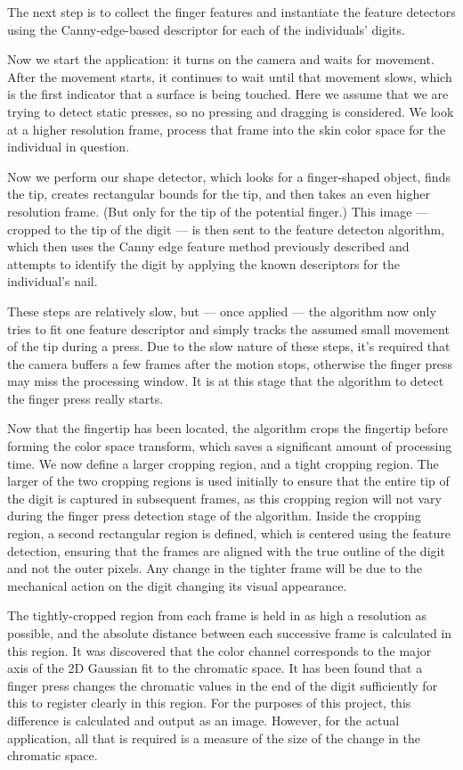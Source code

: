 The next step is to collect the finger features and instantiate the feature detectors using the Canny-edge-based descriptor for each of the individuals' digits.

Now we start the application: it turns on the camera and waits for movement. After the movement starts, it continues to wait until that movement slows, which is the first indicator that a surface is being touched. Here we assume that we are trying to detect static presses, so no pressing and dragging is considered. We look at a higher resolution frame, process that frame into the skin color space for the individual in question. 

Now we perform our shape detector, which looks for a finger-shaped object, finds the tip, creates rectangular bounds for the tip, and then takes an even higher resolution frame. (But only for the tip of the potential finger.) This image --- cropped to the tip of the digit --- is then sent to the feature detecton algorithm, which then uses the Canny edge feature method previously described and attempts to identify the digit by applying the known descriptors for the individual's nail.

These steps are relatively slow, but --- once applied --- the algorithm now only tries to fit one feature descriptor and simply tracks the assumed small movement of the tip during a press. Due to the slow nature of these steps, it's required that the camera buffers a few frames after the motion stops, otherwise the finger press may miss the processing window. It is at this stage that the algorithm to detect the finger press really starts.

Now that the fingertip has been located, the algorithm crops the fingertip before forming the color space transform, which saves a significant amount of processing time. We now define a larger cropping region, and a tight cropping region. The larger of the two cropping regions is used initially to ensure that the entire tip of the digit is captured in subsequent frames, as this cropping region will not vary during the finger press detection stage of the algorithm. Inside the cropping region, a second rectangular region is defined, which is centered using the feature detection, ensuring that the frames are aligned with the true outline of the digit and not the outer pixels. Any change in the tighter frame will be due to the mechanical action on the digit changing its visual appearance.

The tightly-cropped region from each frame is held in as high a resolution as possible, and the absolute distance between each successive frame is calculated in this region. It was discovered that the color channel corresponds to the major axis of the 2D Gaussian fit to the chromatic space. It has been found that a finger press changes the chromatic values in the end of the digit sufficiently for this to register clearly in this region. For the purposes of this project, this difference is calculated and output as an image. However, for the actual application, all that is required is a measure of the size of the change in the chromatic space.


